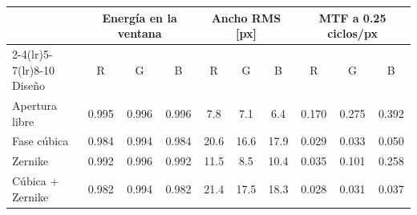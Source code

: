 \begin{tabular}{lccccccccc}
\toprule
 & \multicolumn{3}{c}{Energía en la ventana} & \multicolumn{3}{c}{Ancho RMS [px]} & \multicolumn{3}{c}{MTF a 0.25 ciclos/px} \\
\cmidrule(lr){2-4}\cmidrule(lr){5-7}\cmidrule(lr){8-10}
Diseño & R & G & B & R & G & B & R & G & B \\
\midrule
Apertura libre & 0.995 & 0.996 & 0.996 & 7.8 & 7.1 & 6.4 & 0.170 & 0.275 & 0.392 \\
Fase cúbica & 0.984 & 0.994 & 0.984 & 20.6 & 16.6 & 17.9 & 0.029 & 0.033 & 0.050 \\
Zernike & 0.992 & 0.996 & 0.992 & 11.5 & 8.5 & 10.4 & 0.035 & 0.101 & 0.258 \\
Cúbica + Zernike & 0.982 & 0.994 & 0.982 & 21.4 & 17.5 & 18.3 & 0.028 & 0.031 & 0.037 \\
\bottomrule
\end{tabular}

